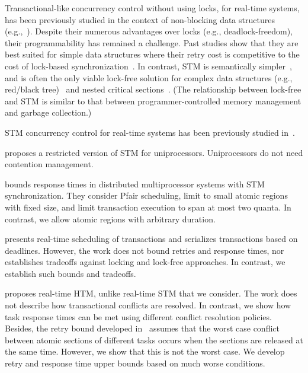 \documentclass[a4paper,english]{article}
\begin{document}
Transactional-like concurrency control without using locks, for real-time systems, has been previously studied in the context of non-blocking data structures (e.g.,~\cite{anderson95realtime}). Despite their numerous advantages over locks 
(e.g., deadlock-freedom), 
their programmability has remained a challenge. 
Past studies show that they are best suited for simple data structures where their retry cost is competitive to the cost of lock-based synchronization~\cite{bc+08}.  In contrast, STM is semantically simpler~\cite{Herlihy:2006:AMP:1146381.1146382}, and is often the only viable lock-free solution for complex data structures (e.g., red/black tree)~\cite{key-1} and nested critical sections~\cite{Saha:2006:MHP:1122971.1123001}. (The relationship between lock-free and STM is similar to that between programmer-controlled memory management and garbage collection.)


STM concurrency control for real-time systems has been previously studied in~\cite{manson2006preemptible,fahmy2009bounding,sarni2009real,schoeberl2010rttm,key-1,barrosmanaging}.


\cite{manson2006preemptible} proposes a restricted version of STM for uniprocessors. Uniprocessors do not need contention management.

\cite{fahmy2009bounding} bounds response times in distributed multiprocessor systems with STM synchronization. They consider Pfair scheduling, limit to small atomic regions with fixed size, and limit transaction execution to span at most two quanta. In contrast, we allow atomic regions with  arbitrary duration. 

\cite{sarni2009real} presents real-time scheduling of transactions and serializes transactions based on deadlines. However, the work does not bound retries and response times, nor establishes  tradeoffs against locking and lock-free approaches. In contrast, we establish such bounds and tradeoffs.


\cite{schoeberl2010rttm} proposes real-time HTM, unlike real-time STM that we consider. 
The work does not describe how transactional conflicts are resolved. 
In contrast, we show how task response times can be met using different conflict resolution policies. 
Besides, the retry bound developed in~\cite{schoeberl2010rttm} assumes that the worst case conflict between atomic sections of different tasks occurs when the sections are released at the same time. However, we show that this is not the worst case. We develop retry and response time upper bounds based on much worse conditions.
\end{document}
